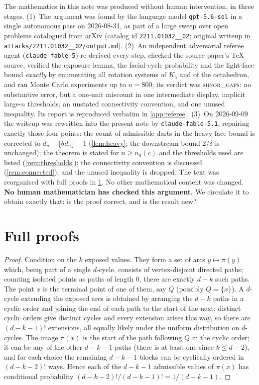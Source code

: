 \documentclass[11pt,a4paper]{article}
\theoremstyle{plain}
\theoremstyle{definition}
\theoremstyle{remark}
\begin{document}
The mathematics in this note was produced without human intervention, in three stages.
(1)~The argument was found by the language model \texttt{gpt-5.6-sol} in a single autonomous pass on 2026-08-31, as part of a large sweep over open problems catalogued from arXiv (catalog id \texttt{2211.01032\_\_02}; original writeup in \texttt{attacks/2211.01032\_\_02/output.md}).
(2)~An independent adversarial referee agent (\texttt{claude-fable-5}) re-derived every step, checked the source paper's \TeX{} source, verified the exposure lemma, the facial-cycle probability and the light-face bound \emph{exactly} by enumerating all rotation systems of $K_5$ and of the octahedron, and ran Monte Carlo experiments up to $n=800$; its verdict was \textsc{minor\_gaps}: no substantive error, but a one-unit miscount in one intermediate display, implicit large-$n$ thresholds, an unstated connectivity convention, and one unused inequality. Its report is reproduced verbatim in \cref{app:referee}.
(3)~On 2026-09-09 the writeup was rewritten into the present note by \texttt{claude-fable-5.1}, repairing exactly those four points: the count of admissible darts in the heavy-face bound is corrected to $d_u-\lfloor\theta d_u\rfloor-1$ (\cref{lem:heavy}; the downstream bound $2/\delta$ is unchanged); the theorem is stated for $n\ge n_0(c)$ and the thresholds used are listed (\cref{rem:thresholds}); the connectivity convention is discussed (\cref{rem:connected}); and the unused inequality is dropped. The text was reorganised with full proofs in \cref{app:proofs}. No other mathematical content was changed.
\textbf{No human mathematician has checked this argument.} We circulate it to obtain exactly that: is the proof correct, and is the result new?


\appendix

\section{Full proofs}\label{app:proofs}

\label{pf:exposure}
\lemexposure*
\begin{proof}
Condition on the $k$ exposed values. They form a set of arcs $y\mapsto\pi(y)$ which, being part of a single $d$-cycle, consists of vertex-disjoint directed paths; counting isolated points as paths of length $0$, there are exactly $d-k$ such paths. The point $x$ is the terminal point of one of them, say $Q$ (possibly $Q=\{x\}$). A $d$-cycle extending the exposed arcs is obtained by arranging the $d-k$ paths in a cyclic order and joining the end of each path to the start of the next; distinct cyclic orders give distinct cycles and every extension arises this way, so there are $(d-k-1)!$ extensions, all equally likely under the uniform distribution on $d$-cycles. The image $\pi(x)$ is the start of the path following $Q$ in the cyclic order; it can be any of the other $d-k-1$ paths (there is at least one since $k\le d-2$), and for each choice the remaining $d-k-1$ blocks can be cyclically ordered in $(d-k-2)!$ ways. Hence each of the $d-k-1$ admissible values of $\pi(x)$ has conditional probability $(d-k-2)!/(d-k-1)!=1/(d-k-1)$.
\end{proof}
\end{document}
